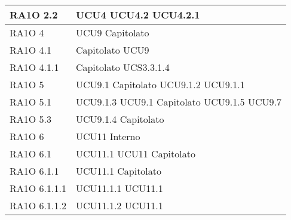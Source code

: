 \begin{center}
\begin{longtable}{ | p{5cm} | p{5cm} |}
        RA1O 2.2 &  UCU4 \newline  UCU4.2 \newline  UCU4.2.1 \newline  \\ \hline      
        RA1O 4 &  UCU9 \newline  Capitolato \newline  \\ \hline      
        RA1O 4.1  &  Capitolato \newline  UCU9 \newline  \\ \hline      
        RA1O 4.1.1  &  Capitolato \newline  UCS3.3.1.4 \newline  \\ \hline      
        RA1O 5  &  UCU9.1 \newline  Capitolato \newline  UCU9.1.2 \newline  UCU9.1.1 \newline  \\ \hline      
        RA1O 5.1 &  UCU9.1.3 \newline  UCU9.1 \newline  Capitolato \newline  UCU9.1.5 \newline  UCU9.7 \newline  \\ \hline      
        RA1O 5.3 &  UCU9.1.4 \newline  Capitolato \newline  \\ \hline      
        RA1O 6 &  UCU11 \newline  Interno \newline  \\ \hline      
        RA1O 6.1  &  UCU11.1 \newline  UCU11 \newline  Capitolato \newline  \\ \hline      
        RA1O 6.1.1  &  UCU11.1 \newline  Capitolato \newline  \\ \hline      
        RA1O 6.1.1.1  &  UCU11.1.1 \newline  UCU11.1 \newline  \\ \hline      
        RA1O 6.1.1.2 &  UCU11.1.2 \newline  UCU11.1 \newline  \\ \hline      

\end{longtable}
\end{center}

